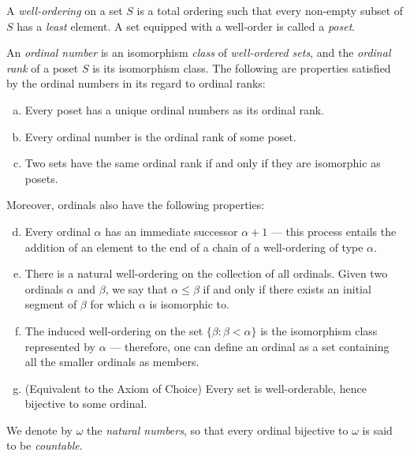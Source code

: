 \begin{definition}
    \label{def:well-ordering}
    A \emph{well-ordering} on a set \(S\) is a total ordering such that every
    non-empty subset of \(S\) has a \emph{least} element. A set equipped with a
    well-order is called a \emph{poset}.
\end{definition}

\begin{definition}[Ordinal]
    \label{def:ordinal}
    An \emph{ordinal number} is an isomorphism \emph{class} of \emph{well-ordered
        sets}, and the \emph{ordinal rank} of a poset \(S\) is its isomorphism
    class. The following are properties satisfied by the ordinal numbers in its
    regard to ordinal ranks:
    \begin{enumerate}[(a)]\setlength\itemsep{0em}
        \item Every poset has a unique ordinal numbers as its ordinal rank.

        \item Every ordinal number is the ordinal rank of some poset.

        \item Two sets have the same ordinal rank if and only if they are isomorphic as
              posets.
    \end{enumerate}
    Moreover, ordinals also have the following properties:
    \begin{enumerate}[(a)]\setcounter{enumi}{3}\setlength\itemsep{0em}
        \item Every ordinal \(\alpha\) has an immediate successor \(\alpha + 1\) ---
              this process entails the addition of an element to the end of a chain of a
              well-ordering of type \(\alpha\).

        \item There is a natural well-ordering on the collection of all ordinals. Given
              two ordinals \(\alpha\) and \(\beta\), we say that \(\alpha \leq \beta\) if
              and only if there exists an initial segment of \(\beta\) for which \(\alpha\)
              is isomorphic to.

        \item The induced well-ordering on the set \(\{\beta \colon \beta < \alpha\}\)
              is the isomorphism class represented by \(\alpha\) --- therefore, one can
              define an ordinal as a set containing all the smaller ordinals as members.

        \item (Equivalent to the Axiom of Choice) Every set is well-orderable, hence
              bijective to some ordinal.
    \end{enumerate}

    We denote by \(\omega\) the \emph{natural numbers}, so that every ordinal
    bijective to \(\omega\) is said to be \emph{countable}.
\end{definition}

